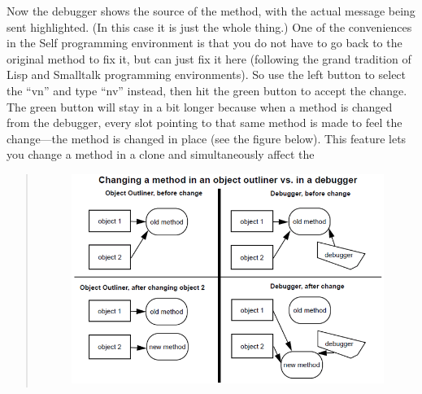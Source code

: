 \documentclass[letterpaper,10pt,english]{sphinxmanual}
\begin{document}
Now the debugger shows the source of the method, with the actual message being sent highlighted.
(In this case it is just the whole thing.) One of the conveniences in the Self programming environment
is that you do not have to go back to the original method to fix it, but can just fix it here (following
the grand tradition of Lisp and Smalltalk programming environments). So use the left
button to select the “vn” and type “nv” instead, then hit the green button to accept the change. The
green button will stay in a bit longer because when a method is changed from the debugger, every
slot pointing to that same method is made to feel the change—the method is changed in place (see
the figure below). This feature lets you change a method in a clone and simultaneously affect the
\begin{quote}
\begin{figure}[htbp]\begin{flushleft}

\includegraphics{Pgm_Env_Image28.png}
\end{flushleft}\end{figure}
\end{quote}
\end{document}
